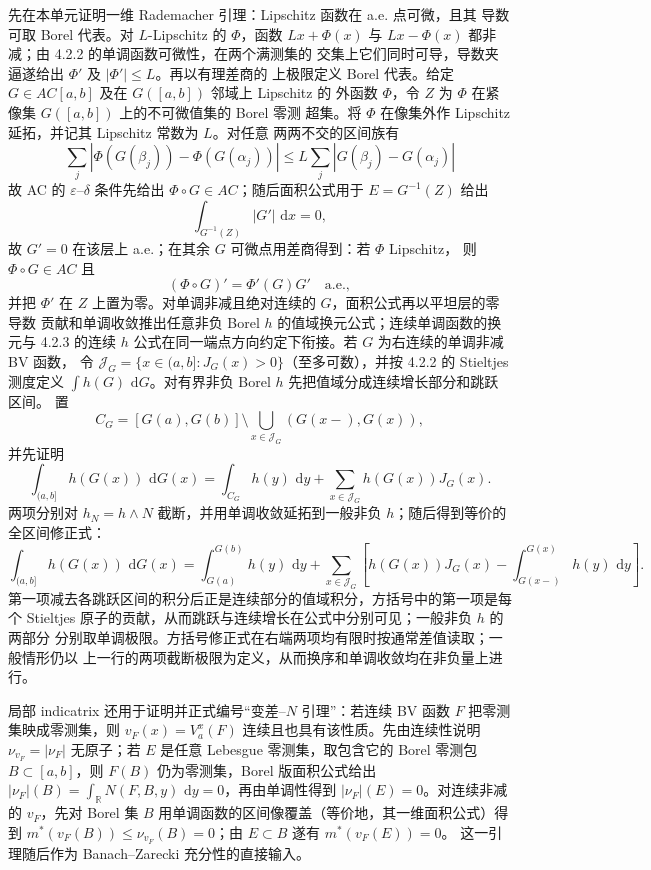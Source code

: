 \documentclass[11pt,a4paper]{ctexart}
\newcommand{\R}{\mathbb R}
\newcommand{\dd}{\,\mathrm d}
\begin{document}
先在本单元证明一维 Rademacher 引理：Lipschitz 函数在 a.e. 点可微，且其
导数可取 Borel 代表。对 $L$-Lipschitz 的 $\Phi$，函数
$Lx+\Phi(x)$ 与 $Lx-\Phi(x)$ 都非减；由 4.2.2 的单调函数可微性，在两个满测集的
交集上它们同时可导，导数夹逼遂给出 $\Phi'$ 及 $|\Phi'|\le L$。再以有理差商的
上极限定义 Borel 代表。给定 $G\in AC[a,b]$ 及在 $G([a,b])$ 邻域上 Lipschitz 的
外函数 $\Phi$，令 $Z$ 为 $\Phi$ 在紧像集 $G([a,b])$ 上的不可微值集的 Borel 零测
超集。将 $\Phi$ 在像集外作 Lipschitz 延拓，并记其 Lipschitz 常数为 $L$。对任意
两两不交的区间族有
\[
\sum_j|\Phi(G(\beta_j))-\Phi(G(\alpha_j))|
\le L\sum_j|G(\beta_j)-G(\alpha_j)|
\]
故 AC 的 $\varepsilon$--$\delta$ 条件先给出 $\Phi\circ G\in AC$；随后面积公式用于
$E=G^{-1}(Z)$ 给出
\[
\int_{G^{-1}(Z)}|G'|\,\dd x=0,
\]
故 $G'=0$ 在该层上 a.e.；在其余 $G$ 可微点用差商得到：若 $\Phi$ Lipschitz，
则 $\Phi\circ G\in AC$ 且
\[
(\Phi\circ G)'=\Phi'(G)G'\quad\text{a.e.},
\]
并把 $\Phi'$ 在 $Z$ 上置为零。对单调非减且绝对连续的 $G$，面积公式再以平坦层的零导数
贡献和单调收敛推出任意非负 Borel $h$ 的值域换元公式；连续单调函数的换元与
4.2.3 的连续 $h$ 公式在同一端点方向约定下衔接。若 $G$ 为右连续的单调非减 BV 函数，
令 $\mathcal J_G=\{x\in(a,b]:J_G(x)>0\}$（至多可数），并按 4.2.2 的 Stieltjes 测度定义
$\int h(G)\,\dd G$。对有界非负 Borel $h$ 先把值域分成连续增长部分和跳跃区间。
置
\[
 C_G=[G(a),G(b)]\setminus\bigcup_{x\in\mathcal J_G}(G(x-),G(x)),
\]
并先证明
\[
 \int_{(a,b]}h(G(x))\,\dd G(x)
 =\int_{C_G}h(y)\,\dd y
 +\sum_{x\in\mathcal J_G}h(G(x))J_G(x).
\]
两项分别对 $h_N=h\wedge N$ 截断，并用单调收敛延拓到一般非负 $h$；随后得到等价的全区间修正式：
\[
\int_{(a,b]}h(G(x))\,\dd G(x)
=\int_{G(a)}^{G(b)}h(y)\,\dd y
+\sum_{x\in\mathcal J_G}\left[h(G(x))J_G(x)-
\int_{G(x-)}^{G(x)}h(y)\,\dd y\right].
\]
第一项减去各跳跃区间的积分后正是连续部分的值域积分，方括号中的第一项是每个
Stieltjes 原子的贡献，从而跳跃与连续增长在公式中分别可见；一般非负 $h$ 的两部分
分别取单调极限。方括号修正式在右端两项均有限时按通常差值读取；一般情形仍以
上一行的两项截断极限为定义，从而换序和单调收敛均在非负量上进行。

局部 indicatrix 还用于证明并正式编号“变差--$N$ 引理”：若连续 BV 函数 $F$
把零测集映成零测集，则 $v_F(x)=V_a^x(F)$ 连续且也具有该性质。先由连续性说明
$\nu_{v_F}=|\nu_F|$ 无原子；若 $E$ 是任意 Lebesgue 零测集，取包含它的 Borel 零测包
$B\subset[a,b]$，则 $F(B)$ 仍为零测集，Borel 版面积公式给出
$|\nu_F|(B)=\int_\R N(F,B,y)\,\dd y=0$，再由单调性得到 $|\nu_F|(E)=0$。对连续非减的
$v_F$，先对 Borel 集 $B$ 用单调函数的区间像覆盖（等价地，其一维面积公式）得到
$m^*(v_F(B))\le\nu_{v_F}(B)=0$；由 $E\subset B$ 遂有 $m^*(v_F(E))=0$。
这一引理随后作为 Banach--Zarecki 充分性的直接输入。
\end{document}
